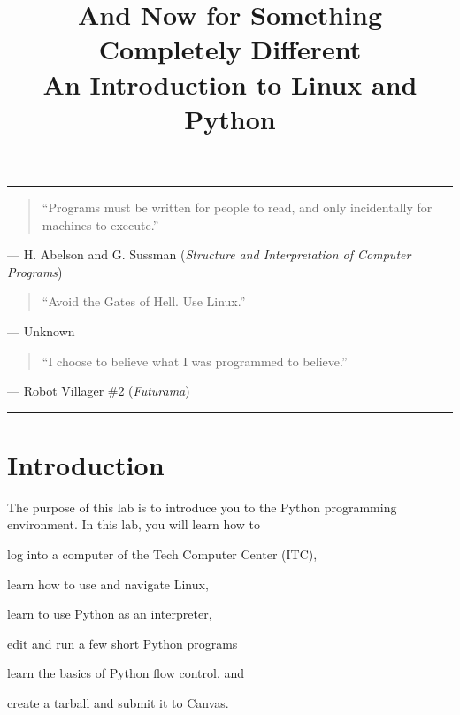 \documentclass[11pt]{cselabheader}
\title{And Now for Something Completely Different\\
  {\large An Introduction to Linux and Python}}
\begin{document}
\maketitle

\hrule

\begin{quotation}
  ``Programs must be written for people to read, and only incidentally for
  machines to execute.''
\end{quotation}
\begin{flushright}
--- H. Abelson and G. Sussman (\textit{Structure and Interpretation of Computer
Programs})
\end{flushright}

\begin{quotation}
``Avoid the Gates of Hell. Use Linux.''
\end{quotation}
\begin{flushright}
--- Unknown
\end{flushright}

\begin{quotation}
``I choose to believe what I was programmed to believe.''
\end{quotation}
\begin{flushright}
  --- Robot Villager \#2 (\textit{Futurama})
\end{flushright}

\hrule
\section{Introduction}

The purpose of this lab is to introduce you to the Python programming
environment. In this lab, you will learn how to
\begin{enumerate*}
  \item log into a computer of the Tech Computer Center (ITC),
  \item learn how to use and navigate Linux,
  \item learn to use Python as an interpreter,
  \item edit and run a few short Python programs
  \item learn the basics of Python flow control, and
  \item create a tarball and submit it to Canvas.
\end{enumerate*}
\end{document}
